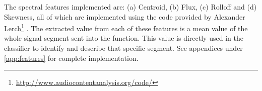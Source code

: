 The spectral features implemented are: (a) Centroid, (b) Flux, (c) Rolloff and (d) Skewness, all of which are implemented using the code provided by Alexander Lerch\footnote{\url{http://www.audiocontentanalysis.org/code/}} \citep{ACA}. The extracted value from each of these features is a mean value of the whole signal segment sent into the function. This value is directly used in the classifier to identify and describe that specific segment. See appendices under \ref{app:features} for complete implementation.
